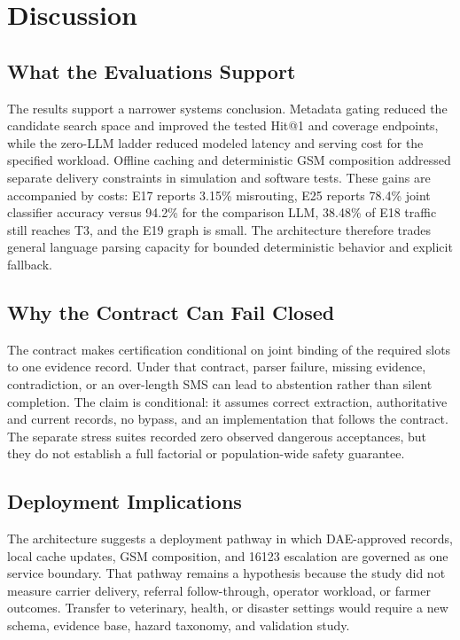\documentclass[11pt,a4paper]{article}
\begin{document}
\section{Discussion}
\label{sec:discussion}

\subsection{What the Evaluations Support}
The results support a narrower systems conclusion. Metadata gating reduced the candidate search space and improved the tested Hit@1 and coverage endpoints, while the zero-LLM ladder reduced modeled latency and serving cost for the specified workload. Offline caching and deterministic GSM composition addressed separate delivery constraints in simulation and software tests. These gains are accompanied by costs: E17 reports 3.15\% misrouting, E25 reports 78.4\% joint classifier accuracy versus 94.2\% for the comparison LLM, 38.48\% of E18 traffic still reaches T3, and the E19 graph is small. The architecture therefore trades general language parsing capacity for bounded deterministic behavior and explicit fallback.

\subsection{Why the Contract Can Fail Closed}
The contract makes certification conditional on joint binding of the required slots to one evidence record. Under that contract, parser failure, missing evidence, contradiction, or an over-length SMS can lead to abstention rather than silent completion. The claim is conditional: it assumes correct extraction, authoritative and current records, no bypass, and an implementation that follows the contract. The separate stress suites recorded zero observed dangerous acceptances, but they do not establish a full factorial or population-wide safety guarantee.

\subsection{Deployment Implications}
The architecture suggests a deployment pathway in which DAE-approved records, local cache updates, GSM composition, and 16123 escalation are governed as one service boundary. That pathway remains a hypothesis because the study did not measure carrier delivery, referral follow-through, operator workload, or farmer outcomes. Transfer to veterinary, health, or disaster settings would require a new schema, evidence base, hazard taxonomy, and validation study.
\end{document}
